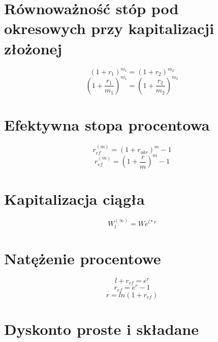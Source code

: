 \documentclass{article}
\begin{document}
\begin{center}
	\newpage
	
	\section{Równoważność stóp pod okresowych przy kapitalizacji złożonej}
	
	\begin{equation}
		(1 + r_1)^{m_1} = (1 + r_2)^{m_2}
	\end{equation}
	\begin{equation}
		(1 + \frac{r_1}{m_1})^{m_1} = (1 + \frac{r_2}{m_2})^{m_2}
	\end{equation}
	
	\section{Efektywna stopa procentowa}
	
	\begin{equation}
		r^{(m)}_{ef} = (1 + r_{okr})^m - 1
	\end{equation}
	\begin{equation}
		r^{(m)}_{ef} = (1 + \frac{r}{m})^m - 1
	\end{equation}
	
	\section{Kapitalizacja ciągła}
	
	\begin{equation}
		W^{(\infty)}_l = We^{l * r}
	\end{equation}
	
	\section{Natężenie procentowe}
	
	\begin{equation}
		l + r_{ef} = e^r
	\end{equation}
	\begin{equation}
		r_{ef} = e^r - 1
	\end{equation}
	\begin{equation}
		r = ln(1 + r_{ef})
	\end{equation}
	
	\section{Dyskonto proste i składane}
	

\end{center}
\end{document}
